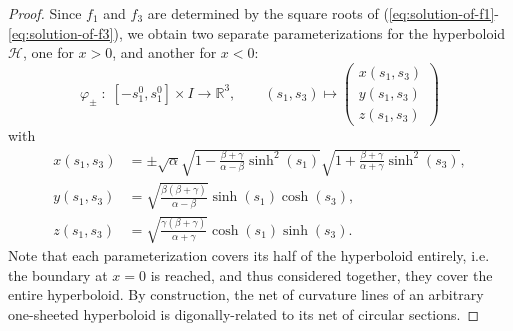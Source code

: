 \documentclass[10pt, a4paper]{article}
\theoremstyle{BoldTopSpacing}
\theoremstyle{BoldTopSpacing}
\theoremstyle{BoldTopSpacing}
\theoremstyle{BoldTopBottomSpacing}
\theoremstyle{BoldTopSpacing}
\theoremstyle{BoldTopBottomSpacing}
\theoremstyle{remark}
\begin{document}
\begin{proof}
Since $f_{1}$ and $f_{3}$ are determined by the square roots of (\ref{eq:solution-of-f1}-\ref{eq:solution-of-f3}), we obtain two separate parameterizations for the hyperboloid $\mathcal{H}$, one for $x > 0$, and another for $x < 0$:
\[
    \varphi_{\pm} \; : \; [-s_{1}^{0}, s_{1}^{0}] \times I \to \mathbb{R}^3, \quad \quad (s_{1}, s_{3}) \mapsto \begin{pmatrix}
        x(s_{1}, s_{3}) \\
        y(s_{1}, s_{3}) \\
        z(s_{1}, s_{3})
        \end{pmatrix}
\]
with
\begin{align*}
x(s_{1}, s_{3}) &= \pm \sqrt{\alpha} \sqrt{1-\frac{\beta + \gamma}{\alpha - \beta}\sinh^2(s_{1})} \sqrt{1 + \frac{\beta+\gamma}{\alpha+\gamma }\sinh^2(s_{3})}, \\
y(s_{1}, s_{3}) &= \sqrt{\frac{\beta (\beta + \gamma)}{\alpha - \beta}} \sinh(s_{1}) \cosh(s_{3}), \\
z(s_{1}, s_{3}) &= \sqrt{\frac{\gamma (\beta + \gamma)}{\alpha + \gamma}} \cosh(s_{1}) \sinh(s_{3}).
\end{align*}
Note that each parameterization covers its half of the hyperboloid entirely, i.e. the boundary at $x = 0$ is reached, and thus considered together, they cover the entire hyperboloid. By construction, the net of curvature lines of an arbitrary one-sheeted hyperboloid is digonally-related to its net of circular sections.
\end{proof}
\end{document}
